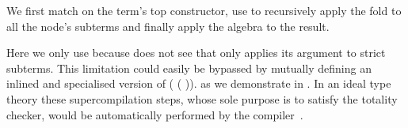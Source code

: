 We first match on the term's top constructor, use 
to recursively apply the fold to all the node's subterms and finally
apply the algebra to the result.

Here we only use \assertTotal{} because \idris{} does not see that
 only applies its argument to strict subterms.
This limitation could easily be bypassed by mutually defining
an inlined and specialised version of
( \IdrisKeyword{\KatlaUnderscore} ( )).
as we demonstrate in .
%
In an ideal type theory these supercompilation steps, whose sole
purpose is to satisfy the totality checker, would be automatically
performed by the compiler~\cite{MANUAL:phd/dublin/Mendel12}.

